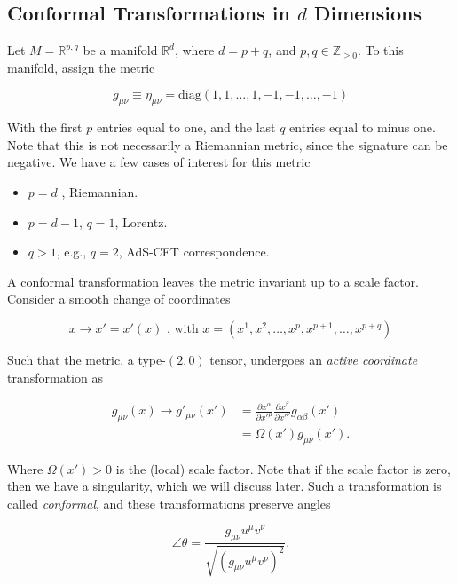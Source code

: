 \subsection*{Conformal Transformations in $d$ Dimensions}

\noindent Let $M = \mathbb{R}^{p,q}$ be a manifold $\mathbb{R}^d$, where $d = p+q$, and $p,q \in \mathbb{Z}_{\ge 0}$. To this manifold, assign the metric

\begin{equation}
g_{\mu\nu} \equiv \eta_{\mu\nu} = \text{diag} (1,1,\dots,1,-1,-1,\dots,-1)
\end{equation}

\noindent With the first $p$ entries equal to one, and the last $q$ entries equal to minus one. Note that this is not necessarily a Riemannian metric, since the signature can be negative. We have a few cases of interest for this metric

\begin{itemize}
\item $p=d$ , Riemannian.
\item $p = d-1$, $q=1$, Lorentz.
\item $q > 1$, e.g., $q=2$, AdS-CFT correspondence.
\end{itemize}

\noindent A conformal transformation leaves the metric invariant up to a scale factor. Consider a smooth change of coordinates

\begin{equation}
x \rightarrow x' = x' (x) \text{ , with } x = (x^1, x^2, \dots, x^p, x^{p+1}, \dots, x^{p+q})
\end{equation}

\noindent Such that the metric, a type-$(2,0)$ tensor, undergoes an \textit{active coordinate} transformation as

\begin{align}
g_{\mu\nu} (x) \rightarrow g'_{\mu\nu} (x') &= \frac{\partial x^\alpha}{\partial x'^\mu} \frac{\partial x^\beta}{\partial x'^\nu} g_{\alpha \beta} (x') \\ 
&= \Omega (x') g_{\mu\nu} (x').
\end{align}

\noindent Where $\Omega(x') > 0$ is the (local) scale factor. Note that if the scale factor is zero, then we have a singularity, which we will discuss later. Such a transformation is called \textit{conformal}, and these transformations preserve angles

\begin{equation}
\angle \theta = \frac{g_{\mu\nu} u^\mu v^\nu}{\sqrt{(g_{\mu\nu} u^\mu v^\nu)^2}}.
\end{equation}

